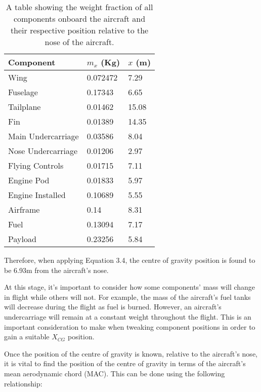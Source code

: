 \documentclass[stu, a4paper, 12pt, floatsintext]{apa7}
\numberwithin{figure}{section}
\numberwithin{table}{section}
\numberwithin{equation}{section}
\begin{document}
\begin{table}[H]
    \centering
    \caption{A table showing the weight fraction of all components onboard the aircraft and their respective position relative to the nose of the aircraft. }
    \label{tab:cg_table}
    \begin{tabular}{@{}lll@{}}
    \toprule
    Component          & $m_x$ (Kg)                      & $x$ (m) \\ \midrule
    Wing               & {\color[HTML]{000000} 0.072472} & 7.29    \\
    Fuselage           & 0.17343                         & 6.65    \\
    Tailplane          & 0.01462                         & 15.08   \\
    Fin                & 0.01389                         & 14.35   \\
    Main Undercarriage & 0.03586                         & 8.04    \\
    Nose Undercarriage & 0.01206                         & 2.97    \\
    Flying Controls    & 0.01715                         & 7.11    \\
    Engine Pod         & 0.01833                         & 5.97    \\
    Engine Installed   & 0.10689                         & 5.55    \\
    Airframe           & 0.14                            & 8.31    \\
    Fuel               & 0.13094                         & 7.17    \\
    Payload            & 0.23256                         & 5.84    \\ \bottomrule
    \end{tabular}
\end{table}

Therefore, when applying Equation 3.4, the centre of gravity position is found to be 6.93m from the aircraft’s nose.

At this stage, it's important to consider how some components' mass will change in flight while others will not. For example, the mass of the aircraft's fuel tanks will decrease during the flight as fuel is burned. However, an aircraft's undercarriage will remain at a constant weight throughout the flight. This is an important consideration to make when tweaking component positions in order to gain a suitable $X_{CG}$ position.

Once the position of the centre of gravity is known, relative to the aircraft’s nose, it is vital to find the position of the centre of gravity in terms of the aircraft’s mean aerodynamic chord (MAC). This can be done using the following relationship:
\end{document}
